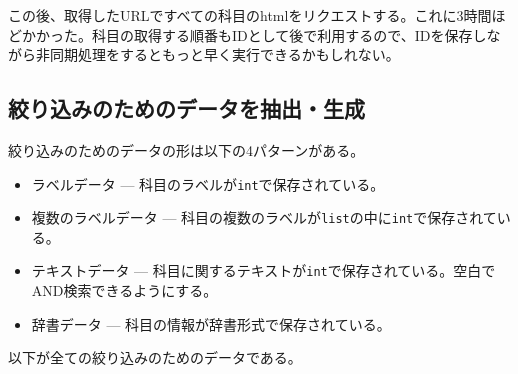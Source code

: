 この後、取得したURLですべての科目のhtmlをリクエストする。これに3時間ほどかかった。科目の取得する順番もIDとして後で利用するので、IDを保存しながら非同期処理をするともっと早く実行できるかもしれない。

\subsection{絞り込みのためのデータを抽出・生成}
絞り込みのためのデータの形は以下の4パターンがある。

\begin{itemize}
  \item ラベルデータ --- 科目のラベルが\texttt{int}で保存されている。
  \item 複数のラベルデータ --- 科目の複数のラベルが\texttt{list}の中に\texttt{int}で保存されている。
  \item テキストデータ --- 科目に関するテキストが\texttt{int}で保存されている。空白でAND検索できるようにする。
  \item 辞書データ --- 科目の情報が辞書形式で保存されている。
\end{itemize}

以下が全ての絞り込みのためのデータである。

